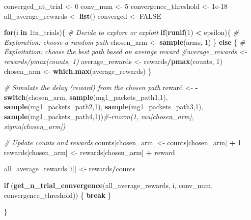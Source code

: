 \documentclass[
]{article}
\newenvironment{Shaded}{\begin{snugshade}}{\end{snugshade}}
\newcommand{\CommentTok}[1]{\textcolor[rgb]{0.56,0.35,0.01}{\textit{#1}}}
\newcommand{\ConstantTok}[1]{\textcolor[rgb]{0.56,0.35,0.01}{#1}}
\newcommand{\ControlFlowTok}[1]{\textcolor[rgb]{0.13,0.29,0.53}{\textbf{#1}}}
\newcommand{\DecValTok}[1]{\textcolor[rgb]{0.00,0.00,0.81}{#1}}
\newcommand{\FloatTok}[1]{\textcolor[rgb]{0.00,0.00,0.81}{#1}}
\newcommand{\FunctionTok}[1]{\textcolor[rgb]{0.13,0.29,0.53}{\textbf{#1}}}
\newcommand{\NormalTok}[1]{#1}
\newcommand{\OtherTok}[1]{\textcolor[rgb]{0.56,0.35,0.01}{#1}}
\newcommand{\SpecialCharTok}[1]{\textcolor[rgb]{0.81,0.36,0.00}{\textbf{#1}}}
\begin{document}
\begin{Shaded}
\begin{Highlighting}[]
\NormalTok{converged\_at\_trial }\OtherTok{\textless{}{-}} \DecValTok{0}
\NormalTok{conv\_num }\OtherTok{\textless{}{-}} \DecValTok{5}
\NormalTok{convergence\_threshold }\OtherTok{\textless{}{-}} \FloatTok{1e{-}18}
\NormalTok{all\_average\_rewards }\OtherTok{\textless{}{-}} \FunctionTok{list}\NormalTok{() }
\NormalTok{converged }\OtherTok{\textless{}{-}} \ConstantTok{FALSE}

\ControlFlowTok{for}\NormalTok{(i }\ControlFlowTok{in} \DecValTok{1}\SpecialCharTok{:}\NormalTok{n\_trials)\{}
  \CommentTok{\# Decide to explore or exploit}
  \ControlFlowTok{if}\NormalTok{(}\FunctionTok{runif}\NormalTok{(}\DecValTok{1}\NormalTok{) }\SpecialCharTok{\textless{}}\NormalTok{ epsilon)\{}
    \CommentTok{\# Exploration: choose a random path}
\NormalTok{    chosen\_arm }\OtherTok{\textless{}{-}} \FunctionTok{sample}\NormalTok{(arms, }\DecValTok{1}\NormalTok{)}
\NormalTok{  \} }\ControlFlowTok{else}\NormalTok{ \{}
    \CommentTok{\# Exploitation: choose the best path based on average reward}
    \CommentTok{\#average\_rewards \textless{}{-} rewards/pmax(counts, 1)}
\NormalTok{    average\_rewards }\OtherTok{\textless{}{-}}\NormalTok{ rewards}\SpecialCharTok{/}\FunctionTok{pmax}\NormalTok{(counts, }\DecValTok{1}\NormalTok{)}
\NormalTok{    chosen\_arm }\OtherTok{\textless{}{-}} \FunctionTok{which.max}\NormalTok{(average\_rewards)}
\NormalTok{  \}}
  
  \CommentTok{\# Simulate the delay (reward) from the chosen path}
\NormalTok{  reward }\OtherTok{\textless{}{-}} \SpecialCharTok{{-}}\ControlFlowTok{switch}\NormalTok{(chosen\_arm,}
                 \FunctionTok{sample}\NormalTok{(mg1\_packets\_path1,}\DecValTok{1}\NormalTok{),}
                 \FunctionTok{sample}\NormalTok{(mg1\_packets\_path2,}\DecValTok{1}\NormalTok{),}
                 \FunctionTok{sample}\NormalTok{(mg1\_packets\_path3,}\DecValTok{1}\NormalTok{),}
                 \FunctionTok{sample}\NormalTok{(mg1\_packets\_path4,}\DecValTok{1}\NormalTok{))}\CommentTok{\#{-}rnorm(1, mu[chosen\_arm], sigma[chosen\_arm])}

  \CommentTok{\# Update counts and rewards}
\NormalTok{  counts[chosen\_arm] }\OtherTok{\textless{}{-}}\NormalTok{ counts[chosen\_arm] }\SpecialCharTok{+} \DecValTok{1}
\NormalTok{  rewards[chosen\_arm] }\OtherTok{\textless{}{-}}\NormalTok{ rewards[chosen\_arm] }\SpecialCharTok{+}\NormalTok{ reward}

\NormalTok{  all\_average\_rewards[[i]] }\OtherTok{\textless{}{-}}\NormalTok{ rewards}\SpecialCharTok{/}\NormalTok{counts}
  
  \ControlFlowTok{if}\NormalTok{ (}\FunctionTok{get\_n\_trial\_convergence}\NormalTok{(all\_average\_rewards, i, conv\_num, convergence\_threshold)) \{}
    \ControlFlowTok{break}
\NormalTok{  \}}
    
\NormalTok{\}}
\end{Highlighting}
\end{Shaded}
\end{document}
